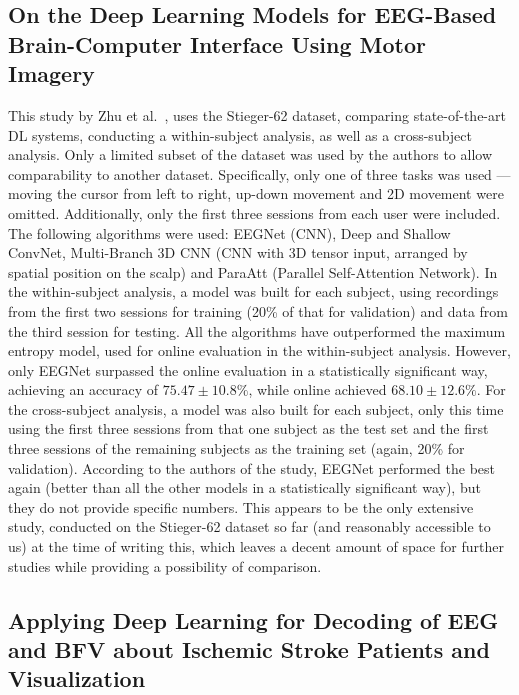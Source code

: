 \documentclass[english, he, bc, kiv, iso690alph, viewonly]{fasthesis}
\begin{document}
\subsection{On the Deep Learning Models for EEG-Based Brain-Computer Interface Using Motor Imagery}

This study by Zhu et al.~\cite{zhu:dl:bci:mi:22}, uses the Stieger-62 dataset, comparing state-of-the-art DL systems, conducting a within-subject analysis, as well as a cross-subject analysis. Only a limited subset of the dataset was used by the authors to allow comparability to another dataset. Specifically, only one of three tasks was used --- moving the cursor from left to right, up-down movement and 2D movement were omitted. Additionally, only the first three sessions from each user were included.
The following algorithms were used: EEGNet (CNN), Deep and Shallow ConvNet, Multi-Branch 3D CNN (CNN with 3D tensor input, arranged by spatial position on the scalp) and ParaAtt (Parallel Self-Attention Network). In the within-subject analysis, a model was built for each subject, using recordings from the first two sessions for training (20\% of that for validation) and data from the third session for testing. All the algorithms have outperformed the maximum entropy model, used for online evaluation in the within-subject analysis. However, only EEGNet surpassed the online evaluation in a statistically significant way, achieving an accuracy of $75.47 \pm 10.8\%$, while online achieved $68.10 \pm 12.6\%$.\@
For the cross-subject analysis, a model was also built for each subject, only this time using the first three sessions from that one subject as the test set and the first three sessions of the remaining subjects as the training set (again, 20\% for validation). According to the authors of the study, EEGNet performed the best again (better than all the other models in a statistically significant way), but they do not provide specific numbers.
This appears to be the only extensive study, conducted on the Stieger-62 dataset so far (and reasonably accessible to us) at the time of writing this, which leaves a decent amount of space for further studies while providing a possibility of comparison.

\subsection{Applying Deep Learning for Decoding of EEG and BFV about Ischemic Stroke Patients and Visualization}
\end{document}

